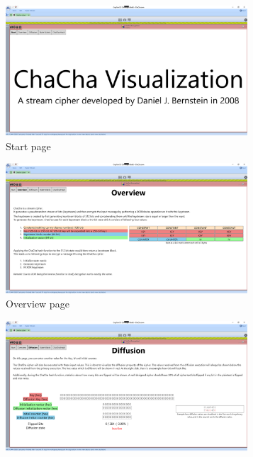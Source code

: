 \begin{figure}
\caption{All pages of the ChaCha visualization plugin in their initial state}
\label{fig:allpages}
\centering
\begin{subfigure}{.5\textwidth}
  \centering
  \includegraphics[width=0.99\textwidth]{figures/ct2/all-pages/1-start.png}
  \caption{Start page}
\end{subfigure}%
\begin{subfigure}{.5\textwidth}
  \centering
  \includegraphics[width=0.99\textwidth]{figures/ct2/all-pages/2-overview.png}
  \caption{Overview page}
\end{subfigure}
\begin{subfigure}{.5\textwidth}
  \centering
  \includegraphics[width=0.99\textwidth]{figures/ct2/all-pages/3-diffusion.png}

\end{subfigure}
\end{figure}
